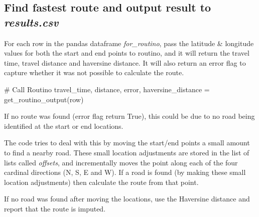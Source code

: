 \documentclass{article}
\begin{document}
\begin{flushleft}
\subsection{Find fastest route and output result to \textit{results.csv}}
For each row in the pandas dataframe \textit{for\_routino}, pass the latitude \& longitude values for both the start and end points to routino, and it will return the travel time, travel distance and haversine distance. It will also return an error flag to capture whether it was not possible to calculate the route.\\

\begin{python}
	# Call Routino	
	travel_time, distance, error, haversine_distance = 
						get_routino_output(row)
\end{python}

If no route was found (error flag return True), this could be due to no road being identified at the start or end locations.\\

\vspace{\baselineskip}

The code tries to deal with this by moving the start/end points a small amount to find a nearby road. These small location adjustments are stored in the list of lists called \textit{offsets}, and incrementally moves the point along each of the four cardinal directions (N, S, E and W). If a road is found (by making these small location adjustments) then calculate the route from that point.\\

\vspace{\baselineskip}

If no road was found after moving the locations, use the Haversine distance and report that the route is imputed.\\

\vspace{\baselineskip}


\end{flushleft}
\end{document}
